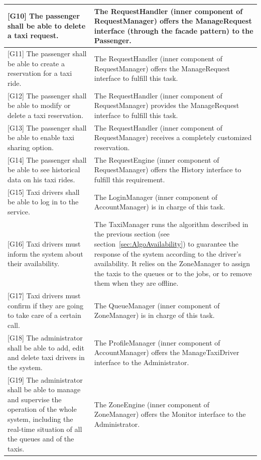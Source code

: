 \documentclass[a4paper,11pt]{report} %
\begin{document}
\begin{center}
\begin{longtable}{| p{7cm} | p{8cm} |}
			{[}G10{]} The passenger shall be able to delete a taxi request. & The RequestHandler (inner component of RequestManager) offers the ManageRequest interface (through the facade pattern) to the Passenger.\\\hline	
			{[}G11{]} The passenger shall be able to create a reservation for a taxi ride. & The RequestHandler (inner component of RequestManager) offers the ManageRequest interface to fulfill this task.\\\hline
			{[}G12{]} The passenger shall be able to modify or delete a taxi reservation.	& The RequestHandler (inner component of RequestManager) provides the ManageRequest interface to fulfill this task.\\\hline
			{[}G13{]} The passenger shall be able to enable taxi sharing option. & The RequestHandler (inner component of RequestManager) receives a completely customized reservation.\\\hline
			{[}G14{]} The passenger shall be able to see historical data on his taxi rides. & The RequestEngine (inner component of RequestManager) offers the History interface to fulfill this requirement.\\\hline
			{[}G15{]} Taxi drivers shall be able to log in to the service. & The LoginManager (inner component of AccountManager) is in charge of this task.\\\hline	
			{[}G16{]} Taxi drivers must inform the system about their availability. & The TaxiManager runs the algorithm described in the previous section (see section~\ref{sec:AlgoAvailability}) to guarantee the response of the system according to the driver's availability. It relies on the ZoneManager to assign the taxis to the queues or to the jobs, or to remove them when they are offline.\\\hline
			{[}G17{]} Taxi drivers must confirm if they are going to take care of a certain call. & The QueueManager (inner component of ZoneManager) is in charge of this task.\\\hline
			{[}G18{]} The administrator shall be able to add, edit and delete taxi drivers in the system. & The ProfileManager (inner component of AccountManager) offers the ManageTaxiDriver interface to the Administrator.\\\hline
			{[}G19{]} The administrator shall be able to manage and supervise the operation of the whole system, including the real-time situation of all the queues and of the taxis. & The ZoneEngine (inner component of ZoneManager) offers the Monitor interface to the Administrator.\\\hline
			
		\end{longtable}
	\end{center} 
	
\end{document}
